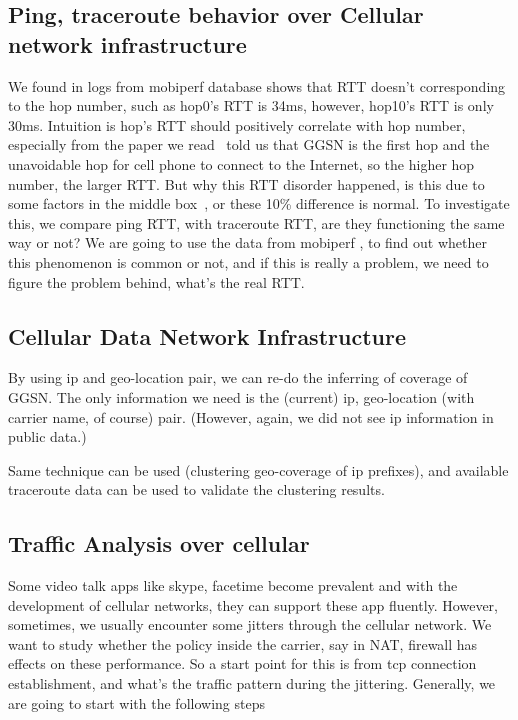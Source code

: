 \documentclass[]{article}
\begin{document}
\subsection{Ping, traceroute behavior over Cellular network infrastructure}
We found in logs from mobiperf database shows that RTT doesn't corresponding to the hop number, such as hop0's RTT is 34ms, however, hop10's RTT is only 30ms. Intuition is hop's RTT should positively correlate with hop number, especially from the paper we read~\cite{infer} told us that GGSN is the first hop and the unavoidable hop for cell phone to connect to the Internet, so the higher hop number, the larger RTT. But why this RTT disorder happened, is this due to some factors in the middle box~\cite{untold}, or these 10\% difference is normal. To investigate this, we compare ping RTT, with traceroute RTT, are they functioning the same way or not? We are going to use the data from mobiperf \cite{mobiperf}, to find out whether this phenomenon is common or not, and if this is really a problem, we need to figure the problem behind, what's the real RTT.

\subsection{Cellular Data Network Infrastructure}

By using ip and geo-location pair, we can re-do the inferring of coverage of GGSN. The only information we need is the (current) ip, geo-location (with carrier name, of course) pair. (However, again, we did not see ip information in public data.)

Same technique can be used (clustering geo-coverage of ip prefixes), and available traceroute data can be used to validate the clustering results.

\subsection{Traffic Analysis over cellular}
Some video talk apps like skype, facetime become prevalent and with the development of cellular networks, they can support these app fluently. However, sometimes, we usually encounter some jitters through the cellular network. We want to study whether the policy inside the carrier, say in NAT, firewall\cite{untold} has effects on these performance. So a start point for this is from tcp connection establishment, and what's the traffic pattern during the jittering. Generally, we are going to start with the following steps 
\end{document}
